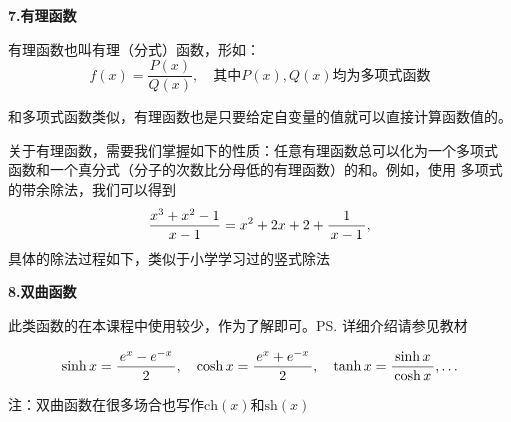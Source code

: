 \bs

{\bf 7.有理函数}

有理函数也叫有理（分式）函数，形如：
$$f(x)=\frac{P(x)}{Q(x)}, \quad\mbox{其中}P(x),Q(x)\mbox{均为多项式函数}$$

和多项式函数类似，有理函数也是只要给定自变量的值就可以直接计算函数值的。

关于有理函数，需要我们掌握如下的性质：任意有理函数总可以化为一个多项式
函数和一个真分式（分子的次数比分母低的有理函数）的和。例如，使用
多项式的带余除法，我们可以得到
$$\frac{x^3+x^2-1}{x-1}=x^2+2x+2+\displaystyle\frac{\,{1}\,}{\,{x-1}\,},$$
具体的除法过程如下，类似于小学学习过的竖式除法
\begin{center}
\end{center}

{\bf 8.双曲函数}

此类函数的在本课程中使用较少，作为了解即可。\ps{详细介绍请参见教材}

$$\sinh x =\displaystyle\frac{\,{e^x-e^{-x}}\,}{\,{2}\,}, \quad
\cosh x =\displaystyle\frac{\,{e^x+e^{-x}}\,}{\,{2}\,}, \quad\tanh x=\displaystyle\frac{\,{\sinh
x}\,}{\,{\cosh x}\,}, \ldots$$

注：双曲函数在很多场合也写作$\mathrm{ch}(x)$和$\mathrm{sh}(x)$

\bigskip

